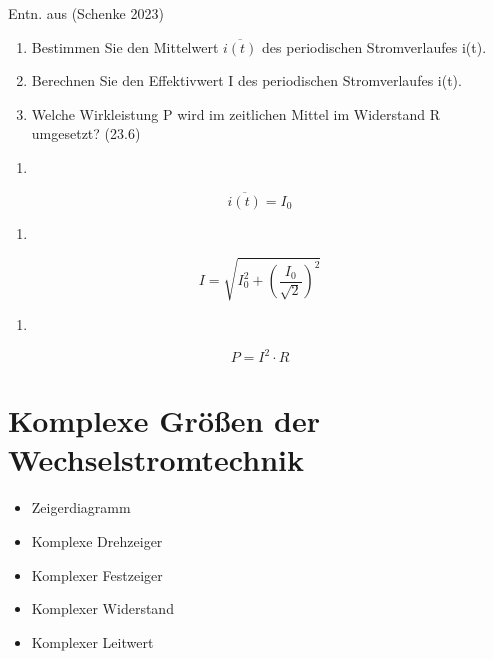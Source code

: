 \documentclass[
  ngerman,
  letterpaper,
]{scrbook}
\providecommand{\tightlist}{%
  \setlength{\itemsep}{0pt}\setlength{\parskip}{0pt}}
\begin{document}
Entn. aus (Schenke 2023)

\begin{enumerate}
\def\labelenumi{\alph{enumi})}
\item
  Bestimmen Sie den Mittelwert \(\overline{i(t)}\) des periodischen
  Stromverlaufes i(t).
\item
  Berechnen Sie den Effektivwert I des periodischen Stromverlaufes i(t).
\item
  Welche Wirkleistung P wird im zeitlichen Mittel im Widerstand R
  umgesetzt? (23.6)
\end{enumerate}

\begin{tcolorbox}[enhanced jigsaw, titlerule=0mm, rightrule=.15mm, toprule=.15mm, colback=white, toptitle=1mm, bottomrule=.15mm, coltitle=black, leftrule=.75mm, arc=.35mm, colbacktitle=quarto-callout-caution-color!10!white, opacityback=0, bottomtitle=1mm, colframe=quarto-callout-caution-color-frame, opacitybacktitle=0.6, breakable, title=\textcolor{quarto-callout-caution-color}{\faFire}\hspace{0.5em}{Lösung}, left=2mm]

\begin{enumerate}
\def\labelenumi{\alph{enumi})}
\tightlist
\item
\end{enumerate}

\[
\overline{i(t)} = I_0
\]

\begin{enumerate}
\def\labelenumi{\alph{enumi})}
\setcounter{enumi}{1}
\tightlist
\item
\end{enumerate}

\[
I = \sqrt{I_0^2 + \left( \frac{I_0}{\sqrt{2}} \right)^2}
\]

\begin{enumerate}
\def\labelenumi{\alph{enumi})}
\setcounter{enumi}{2}
\tightlist
\item
\end{enumerate}

\[
P = I^2 \cdot R
\]

\end{tcolorbox}

\chapter{Komplexe Größen der
Wechselstromtechnik}\label{komplexe-gruxf6uxdfen-der-wechselstromtechnik}

\begin{itemize}
\tightlist
\item
  Zeigerdiagramm
\item
  Komplexe Drehzeiger
\item
  Komplexer Festzeiger
\item
  Komplexer Widerstand
\item
  Komplexer Leitwert
\end{itemize}
\end{document}
